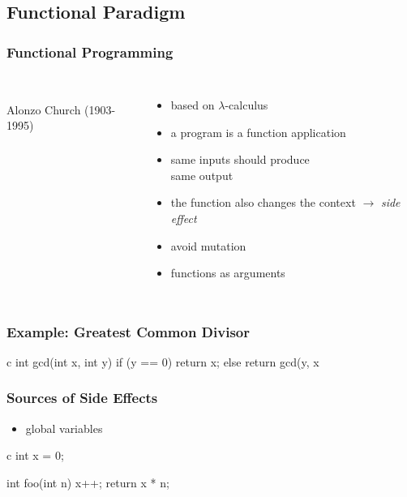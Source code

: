 \documentclass[dvipsnames]{beamer}
\theoremstyle{plain}
\begin{document}
\subsection{Functional Paradigm}

\begin{frame}
  \frametitle{Functional Programming}

  \begin{columns}
    \begin{center}
      \\
      Alonzo Church (1903-1995)
    \end{center}

    \begin{itemize}
      \item based on $\lambda$-calculus
      \item a program is a function application
      \item same inputs should produce\\
        same output

      \pause
      \medskip
      \item the function also changes
        the context $\rightarrow$ \emph{side effect}
      \item \alert{avoid mutation}

      \pause
      \medskip
      \item functions as arguments
    \end{itemize}
  \end{columns}
\end{frame}

\begin{frame}[fragile]
  \frametitle{Example: Greatest Common Divisor}

  \begin{example}
    \begin{pygments}[]{c}
int gcd(int x, int y)
{
    if (y == 0)
        return x;
    else
        return gcd(y, x %
}
    \end{pygments}
  \end{example}
\end{frame}

\begin{frame}[fragile]
  \frametitle{Sources of Side Effects}

  \begin{itemize}
    \item global variables
  \end{itemize}

  \begin{example}
    \begin{pygments}[]{c}
int x = 0;

int foo(int n)
{
    x++;
    return x * n;
}
    \end{pygments}
  \end{example}
\end{frame}
\end{document}
